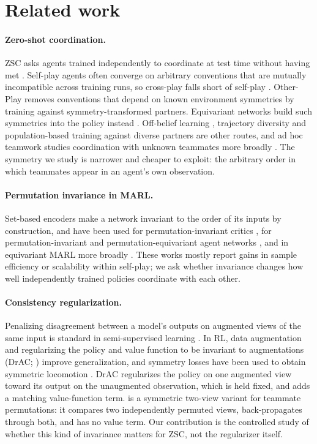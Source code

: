 \section{Related work}
\label{sec:related}

\paragraph{Zero-shot coordination.}
ZSC asks agents trained independently to coordinate at test time without
having met \citep{hu2020otherplay,treutlein2021zsc}. Self-play agents often
converge on arbitrary conventions that are mutually incompatible across
training runs, so cross-play falls short of self-play
\citep{carroll2019overcooked,bard2020hanabi}. Other-Play
\citep{hu2020otherplay} removes conventions that depend on known environment
symmetries by training against symmetry-transformed partners. Equivariant
networks build such symmetries into the policy instead
\citep{muglich2022equivariant}. Off-belief learning \citep{hu2021obl},
trajectory diversity \citep{lupu2021trajedi} and population-based training
against diverse partners \citep{strouse2021fcp} are other routes, and ad hoc
teamwork studies coordination with unknown teammates more broadly
\citep{stone2010adhoc,rahman2021open}. The symmetry we study is narrower and
cheaper to exploit: the arbitrary order in which teammates appear in an agent's
own observation.

\paragraph{Permutation invariance in MARL.}
Set-based encoders \citep{zaheer2017deepsets} make a network invariant to the
order of its inputs by construction, and have been used for permutation-invariant
critics \citep{liu2020pic}, for permutation-invariant and permutation-equivariant
agent networks \citep{hao2023pipe}, and in equivariant MARL more broadly
\citep{vanderpol2022homomorphic}. These works mostly report gains in sample
efficiency or scalability within self-play; we ask whether invariance changes
how well independently trained policies coordinate with each other.

\paragraph{Consistency regularization.}
Penalizing disagreement between a model's outputs on augmented views of the
same input is standard in semi-supervised learning \citep{sohn2020fixmatch}.
In RL, data augmentation \citep{laskin2020rad} and regularizing the policy and
value function to be invariant to augmentations (DrAC; \citealp{raileanu2021drac})
improve generalization, and symmetry losses have been used to obtain symmetric
locomotion \citep{yu2018symmetric}. DrAC regularizes the policy on one
augmented view toward its output on the unaugmented observation, which is held
fixed, and adds a matching value-function term. \picr{} is a symmetric
two-view variant for teammate permutations: it compares two independently
permuted views, back-propagates through both, and has no value term. Our
contribution is the controlled study of whether this kind of invariance matters
for ZSC, not the regularizer itself.
